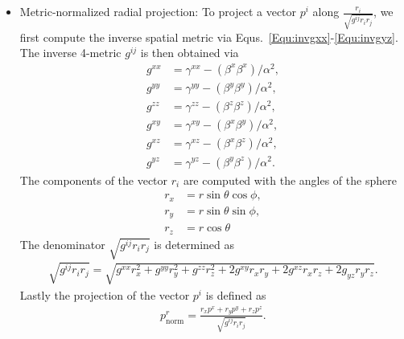 \documentclass{article}
\begin{document}
\begin{itemize}
  Equs.~\eqref{Equ:invgxx}-\eqref{Equ:invgyz} to get
  \begin{align}
    p^x &= \gamma&{xx}p^x+\gamma^{xy}p^y+\gamma^{xz}p^z,\label{Equ:raisepx}\\
    p^y &= \gamma&{xy}p^x+\gamma^{yy}p^y+\gamma^{yz}p^z,\label{Equ:raisepy}\\
    p^z &= \gamma&{xz}p^x+\gamma^{yz}p^y+\gamma^{zz}p^z.\label{Equ:raisepz}
  \end{align}
  \item Metric-normalized radial projection: To project a vector $p^i$ along $\frac{r_i}{\sqrt{g^{ij}r_ir_j}}$, we first compute the
  inverse spatial metric via Equs.~\eqref{Equ:invgxx}-\eqref{Equ:invgyz}. The inverse 4-metric $g^{ij}$ is then obtained via
  \begin{align}
    g^{xx} &= \gamma^{xx}-(\beta^x\beta^x)/\alpha^2,\nonumber\\
    g^{yy} &= \gamma^{yy}-(\beta^y\beta^y)/\alpha^2,\nonumber\\
    g^{zz} &= \gamma^{zz}-(\beta^z\beta^z)/\alpha^2,\nonumber\\
    g^{xy} &= \gamma^{xy}-(\beta^x\beta^y)/\alpha^2,\nonumber\\
    g^{xz} &= \gamma^{xz}-(\beta^x\beta^z)/\alpha^2,\nonumber\\
    g^{yz} &= \gamma^{yz}-(\beta^y\beta^z)/\alpha^2.\nonumber
  \end{align}
  The components of the vector $r_i$ are computed with the angles of the sphere
  \begin{align}
    r_x&=r\sin{\theta}\cos{\phi},\nonumber\\
    r_y&=r\sin{\theta}\sin{\phi},\nonumber\\
    r_z&=r\cos{\theta}\nonumber
  \end{align}
  The denominator $\sqrt{g^{ij}r_ir_j}$ is determined as
  \begin{align}
    \sqrt{g^{ij}r_ir_j}=\sqrt{g^{xx}r_x^2+g^{yy}r_y^2+g^{zz}r_z^2+2g^{xy}r_xr_y+2g^{xz}r_xr_z+2g_{yz}r_yr_z}.\nonumber
  \end{align}
  Lastly the projection of the vector $p^i$ is defined as
  \begin{align}
    p^r_{\mathrm{norm}}=\frac{r_xp^x+r_yp^y+r_zp^z}{\sqrt{g^{ij}r_ir_j}}.\label{Equ:radnormproj}
  \end{align}
\end{itemize}
\end{document}
